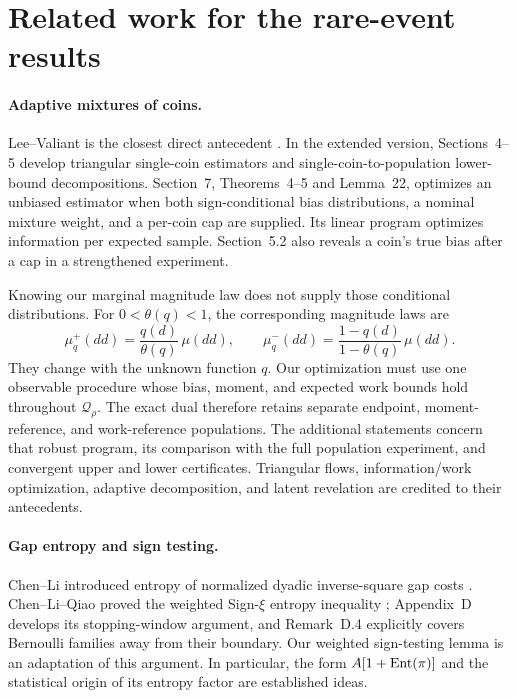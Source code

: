 \section{Related work for the rare-event results}
\label{sec:related-work}

\paragraph{Adaptive mixtures of coins.}
Lee--Valiant is the closest direct antecedent \cite{leevaliant}. In the extended
version, Sections~4--5 develop triangular single-coin estimators and
single-coin-to-population lower-bound decompositions. Section~7,
Theorems~4--5 and Lemma~22, optimizes an unbiased estimator when both
sign-conditional bias distributions, a nominal mixture weight, and a
per-coin cap are supplied. Its linear program optimizes information per
expected sample. Section~5.2 also reveals a coin's true bias after a cap
in a strengthened experiment.

Knowing our marginal magnitude law does not supply those conditional
distributions. For $0<\theta(q)<1$, the corresponding magnitude laws are
\[
 \mu_q^+(dd)=\frac{q(d)}{\theta(q)}\,\mu(dd),\qquad
 \mu_q^-(dd)=\frac{1-q(d)}{1-\theta(q)}\,\mu(dd).
\]
They change with the unknown function $q$. Our optimization must use one
observable procedure whose bias, moment, and expected work bounds hold
throughout $\mathcal Q_\rho$. The exact dual therefore retains separate
endpoint, moment-reference, and work-reference populations. The
additional statements concern that robust program, its comparison with
the full population experiment, and convergent upper and lower
certificates. Triangular flows, information/work optimization, adaptive
decomposition, and latent revelation are credited to their antecedents.

\paragraph{Gap entropy and sign testing.}
Chen--Li introduced entropy of normalized dyadic inverse-square gap
costs \cite[Definition~3.3]{cl16}. Chen--Li--Qiao proved the weighted
Sign-$\xi$ entropy inequality \cite[Lemma~4.1]{clq}; Appendix~D develops
its stopping-window argument, and Remark~D.4 explicitly covers Bernoulli
families away from their boundary. Our weighted sign-testing lemma is
an adaptation of this argument. In particular, the form
$A[1+\operatorname{Ent}(\pi)]$ and the statistical origin of its entropy factor are
established ideas.


